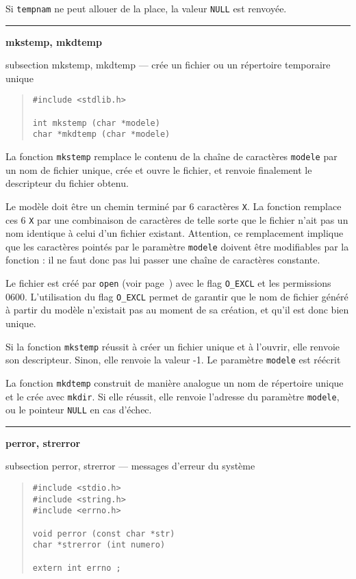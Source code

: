 \documentclass [twoside] {report}
\newcommand {\primitive} [1]
    {
	\phantomsection
	{\large \textbf {#1}}
	\addcontentsline {toc} {subsection} {#1}
    }
\newcommand {\separation}
    {
	\vspace {5mm}
	\nopagebreak
	\hrule
    }
\begin{document}
Si \texttt {tempnam} ne peut allouer de la place, la valeur \texttt {NULL} est
renvoyée.



\separation 
\primitive {mkstemp, mkdtemp} --- crée un fichier ou un répertoire temporaire unique
    \label {mkstemp}

\begin {quote}
\begin {verbatim}
#include <stdlib.h>

int mkstemp (char *modele)
char *mkdtemp (char *modele)
\end{verbatim}
\end {quote}

La fonction \texttt {mkstemp} remplace le contenu de la chaîne de
caractères \texttt {modele} par un nom de fichier unique, crée et
ouvre le fichier, et renvoie finalement le descripteur du fichier obtenu.

Le modèle doit être un chemin terminé par 6 caractères \texttt{X}. La
fonction remplace ces 6 \texttt{X} par une combinaison de caractères
de telle sorte que le fichier n'ait pas un nom identique à celui d'un
fichier existant. Attention, ce remplacement implique que les caractères
pointés par le paramètre \texttt{modele} doivent être modifiables par
la fonction : il ne faut donc pas lui passer une chaîne de caractères
constante.

Le fichier est créé par \texttt {open} (voir page~\pageref {open})
avec le flag \texttt{O\_EXCL} et les permissions 0600. L'utilisation du
flag \texttt{O\_EXCL} permet de garantir que le nom de fichier généré
à partir du modèle n'existait pas au moment de sa création, et qu'il
est donc bien unique.

Si la fonction \texttt {mkstemp} réussit à créer un fichier unique
et à l'ouvrir, elle renvoie son descripteur. Sinon, elle renvoie la
valeur -1. Le paramètre \texttt{modele} est réécrit 

La fonction \texttt {mkdtemp} construit de manière analogue un nom de
répertoire unique et le crée avec \texttt {mkdir}. Si elle réussit,
elle renvoie l'adresse du paramètre \texttt{modele}, ou le pointeur
\texttt {NULL} en cas d'échec.


\separation 
\primitive {perror, strerror} --- messages d'erreur du système

\begin {quote}
\begin {verbatim}
#include <stdio.h>
#include <string.h>
#include <errno.h>

void perror (const char *str)
char *strerror (int numero)

extern int errno ;
\end{verbatim}
\end {quote}
\end{document}
